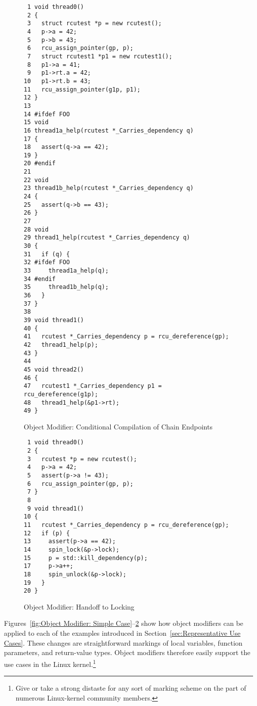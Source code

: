 \begin{figure}[tbp]
{ \scriptsize
\begin{verbatim}
 1 void thread0()
 2 {
 3   struct rcutest *p = new rcutest();
 4   p->a = 42;
 5   p->b = 43;
 6   rcu_assign_pointer(gp, p);
 7   struct rcutest1 *p1 = new rcutest1();
 8   p1->a = 41;
 9   p1->rt.a = 42;
10   p1->rt.b = 43;
11   rcu_assign_pointer(g1p, p1);
12 }
13
14 #ifdef FOO
15 void
16 thread1a_help(rcutest *_Carries_dependency q)
17 {
18   assert(q->a == 42);
19 }
20 #endif
21
22 void
23 thread1b_help(rcutest *_Carries_dependency q)
24 {
25   assert(q->b == 43);
26 }
27
28 void
29 thread1_help(rcutest *_Carries_dependency q)
30 {
31   if (q) {
32 #ifdef FOO
33     thread1a_help(q);
34 #endif
35     thread1b_help(q);
36   }
37 }
38
39 void thread1()
40 {
41   rcutest *_Carries_dependency p = rcu_dereference(gp);
42   thread1_help(p);
43 }
44
45 void thread2()
46 {
47   rcutest1 *_Carries_dependency p1 = rcu_dereference(g1p);
48   thread1_help(&p1->rt);
49 }
\end{verbatim}
}
\caption{Object Modifier: Conditional Compilation of Chain Endpoints}
\label{fig:Object Modifier: Conditional Compilation of Chain Endpoints}
\end{figure}

\begin{figure}[tbp]
{ \scriptsize
\begin{verbatim}
 1 void thread0()
 2 {
 3   rcutest *p = new rcutest();
 4   p->a = 42;
 5   assert(p->a != 43);
 6   rcu_assign_pointer(gp, p);
 7 }
 8
 9 void thread1()
10 {
11   rcutest *_Carries_dependency p = rcu_dereference(gp);
12   if (p) {
13     assert(p->a == 42);
14     spin_lock(&p->lock);
15     p = std::kill_dependency(p);
17     p->a++;
18     spin_unlock(&p->lock);
19   }
20 }
\end{verbatim}
}
\caption{Object Modifier: Handoff to Locking}
\label{fig:Object Modifier: Handoff to Locking}
\end{figure}

Figures~\ref{fig:Object Modifier: Simple Case}--\ref{fig:Object Modifier: Handoff to Locking}
show how object modifiers can be applied to each of the examples
introduced in Section~\ref{sec:Representative Use Cases}.
These changes are straightforward markings of local variables, function
parameters, and return-value types.
Object modifiers therefore easily support the use cases in the Linux
kernel.\footnote{
	Give or take a strong distaste for any sort of marking scheme
	on the part of numerous Linux-kernel community members.}
